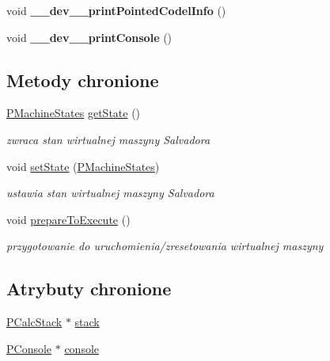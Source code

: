 \begin{CompactItemize}
\item 
\hypertarget{classPVirtualMachine_7fa0eaf24d0e5f6fa1dca0aa105d147e}{
void \textbf{\_\-\_\-dev\_\-\_\-printPointedCodelInfo} ()}
\label{classPVirtualMachine_7fa0eaf24d0e5f6fa1dca0aa105d147e}

\item 
\hypertarget{classPVirtualMachine_9fbb7c0313e22051eebfd2e316ec609b}{
void \textbf{\_\-\_\-dev\_\-\_\-printConsole} ()}
\label{classPVirtualMachine_9fbb7c0313e22051eebfd2e316ec609b}

\end{CompactItemize}
\subsection*{Metody chronione}
\begin{CompactItemize}
\item 
\hyperlink{penums_8h_3b12ec7c990da3435462047165bc0c6d}{PMachineStates} \hyperlink{classPVirtualMachine_699839f4df2106065458127c36b4bfca}{getState} ()
\begin{CompactList}\small\item\em zwraca stan wirtualnej maszyny Salvadora \item\end{CompactList}\item 
void \hyperlink{classPVirtualMachine_bede8c1e068c19b9bc61a957de70cda8}{setState} (\hyperlink{penums_8h_3b12ec7c990da3435462047165bc0c6d}{PMachineStates})
\begin{CompactList}\small\item\em ustawia stan wirtualnej maszyny Salvadora \item\end{CompactList}\item 
void \hyperlink{classPVirtualMachine_513af8673f1430cd04fd0a0e46abedd4}{prepareToExecute} ()
\begin{CompactList}\small\item\em przygotowanie do uruchomienia/zresetowania wirtualnej maszyny \item\end{CompactList}\end{CompactItemize}
\subsection*{Atrybuty chronione}
\begin{CompactItemize}
\item 
\hyperlink{classPCalcStack}{PCalcStack} $\ast$ \hyperlink{classPVirtualMachine_fe929445de96589087a96a8f1188fac0}{stack}
\item 
\hyperlink{classPConsole}{PConsole} $\ast$ \hyperlink{classPVirtualMachine_67feeb2d88b4c8b766d10d6f7d8eb65b}{console}
\end{CompactItemize}


